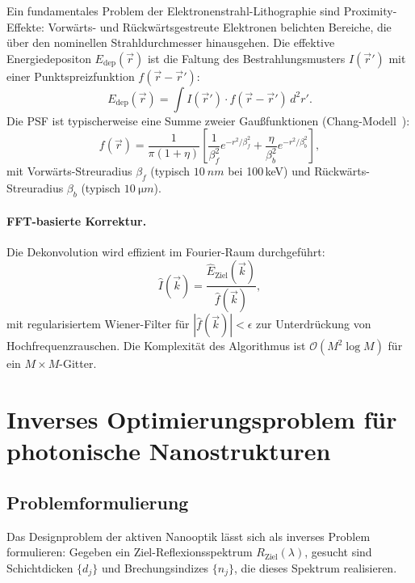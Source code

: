 ﻿\documentclass[a4paper,12pt]{scrreprt}
\theoremstyle{definition}
\newcommand{\ordre}[1]{\mathcal{O}\!\left(#1\right)}
\begin{document}
Ein fundamentales Problem der Elektronenstrahl-Lithographie sind
Proximity-Effekte: Vorwärts- und Rückwärtsgestreute Elektronen belichten
Bereiche, die über den nominellen Strahldurchmesser hinausgehen. Die
effektive Energiedepositon $E_\mathrm{dep}(\vec{r})$ ist die Faltung des
Bestrahlungsmusters $I(\vec{r}')$ mit einer Punktspreizfunktion $f(\vec{r} - \vec{r}')$:
\begin{equation}
  E_\mathrm{dep}(\vec{r}) = \int I(\vec{r}') \cdot f(\vec{r} - \vec{r}')\, d^2r'.
\end{equation}
Die PSF ist typischerweise eine Summe zweier Gaußfunktionen (Chang-Modell~\cite{Chang1975}):
\begin{equation}
  f(\vec{r}) = \frac{1}{\pi(1+\eta)}
  \left[\frac{1}{\beta_f^2} e^{-r^2/\beta_f^2} + \frac{\eta}{\beta_b^2} e^{-r^2/\beta_b^2}\right],
\end{equation}
mit Vorwärts-Streuradius $\beta_f$ (typisch $\SI{10}{nm}$ bei 100\,keV) und
Rückwärts-Streuradius $\beta_b$ (typisch $\SI{10}{\micro m}$).

\paragraph{FFT-basierte Korrektur.}
Die Dekonvolution wird effizient im Fourier-Raum durchgeführt:
\begin{equation}
  \hat{I}(\vec{k}) = \frac{\hat{E}_\mathrm{Ziel}(\vec{k})}{\hat{f}(\vec{k})},
\end{equation}
mit regularisiertem Wiener-Filter für $|\hat{f}(\vec{k})| < \epsilon$ zur
Unterdrückung von Hochfrequenzrauschen. Die Komplexität des Algorithmus ist
$\ordre{M^2 \log M}$ für ein $M \times M$-Gitter.

\section{Inverses Optimierungsproblem für photonische Nanostrukturen}

\subsection{Problemformulierung}

Das Designproblem der aktiven Nanooptik lässt sich als inverses Problem
formulieren: Gegeben ein Ziel-Reflexionsspektrum $R_\mathrm{Ziel}(\lambda)$,
gesucht sind Schichtdicken $\{d_j\}$ und Brechungsindizes $\{n_j\}$, die
dieses Spektrum realisieren.
\end{document}
